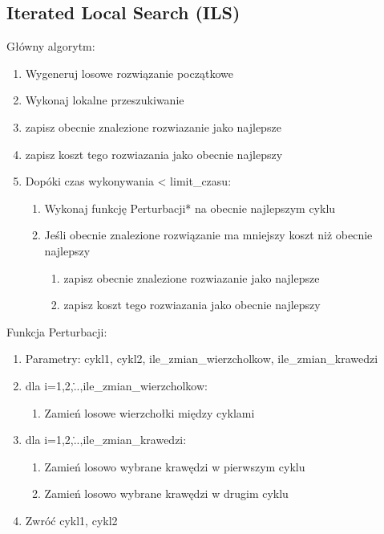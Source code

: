 \documentclass[11pt]{article}
\begin{document}
\subsection{Iterated Local Search (ILS)}\label{subsec:ils}

Główny algorytm:
\begin{enumerate}
    \item Wygeneruj losowe rozwiązanie początkowe
    \item Wykonaj lokalne przeszukiwanie
    \item zapisz obecnie znalezione rozwiazanie jako najlepsze
    \item zapisz koszt tego rozwiazania jako obecnie najlepszy
    \item Dopóki czas wykonywania < limit\_czasu:
        \begin{enumerate}
            \item Wykonaj funkcję Perturbacji* na obecnie najlepszym cyklu
            \item Jeśli obecnie znalezione rozwiązanie ma mniejszy koszt niż obecnie najlepszy
                \begin{enumerate}
                    \item zapisz obecnie znalezione rozwiazanie jako najlepsze
                    \item zapisz koszt tego rozwiazania jako obecnie najlepszy
                \end{enumerate}
        \end{enumerate}
\end{enumerate}

Funkcja Perturbacji:
\begin{enumerate}
    \item Parametry: cykl1, cykl2, ile\_zmian\_wierzcholkow, ile\_zmian\_krawedzi
    \item dla i=1,2,\...,ile\_zmian\_wierzcholkow:
        \begin{enumerate}
            \item Zamień losowe wierzchołki między cyklami
        \end{enumerate}

    \item dla i=1,2,\...,ile\_zmian\_krawedzi:
        \begin{enumerate}
            \item Zamień losowo wybrane krawędzi w pierwszym cyklu
            \item Zamień losowo wybrane krawędzi w drugim cyklu
        \end{enumerate}
    \item Zwróć cykl1, cykl2
\end{enumerate}
\end{document}
